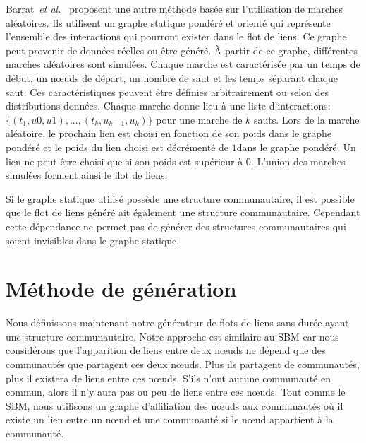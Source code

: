 Barrat~\emph{et al.}~\cite{Barrat2013a} proposent une autre méthode basée sur l'utilisation de marches aléatoires.
Ils utilisent un graphe statique pondéré et orienté qui représente l'ensemble des interactions qui pourront exister dans le flot de liens.
Ce graphe peut provenir de données réelles ou être généré.
\`A partir de ce graphe, différentes marches aléatoires sont simulées.
Chaque marche est caractérisée par un temps de début, un n\oe uds de départ, un nombre de saut et les temps séparant chaque saut.
Ces caractéristiques peuvent être définies arbitrairement ou selon des distributions données.
Chaque marche donne lieu à une liste d'interactions: $\{(t_1,u0,u1), ..., (t_k,u_{k-1}, u_k)\}$ pour une marche de $k$ sauts.
Lors de la marche aléatoire, le prochain lien est choisi en fonction de son poids dans le graphe pondéré et le poids du lien choisi est décrémenté de $1$dans le graphe pondéré.
Un lien ne peut être choisi que si son poids est supérieur à $0$.
L'union des marches simulées forment ainsi le flot de liens.


Si le graphe statique utilisé possède une structure communautaire, il est possible que le flot de liens généré ait également une structure communautaire.
Cependant cette dépendance ne permet pas de générer des structures communautaires qui soient invisibles dans le graphe statique.


\section{Méthode de génération}
\label{sec:versqualite_methode}

Nous définissons maintenant notre générateur de flots de liens sans durée ayant une structure communautaire.
Notre approche est similaire au SBM car nous considérons que l'apparition de liens entre deux n\oe uds ne dépend que des communautés que partagent ces deux n\oe uds.
Plus ils partagent de communautés, plus il existera de liens entre ces n\oe uds.
S'ils n'ont aucune communauté en commun, alors il n'y aura pas ou peu de liens entre ces n\oe uds.
Tout comme le SBM, nous utilisons un graphe d'affiliation des n\oe uds aux communautés où il existe un lien entre un n\oe ud et une communauté si le n\oe ud appartient à la communauté.

